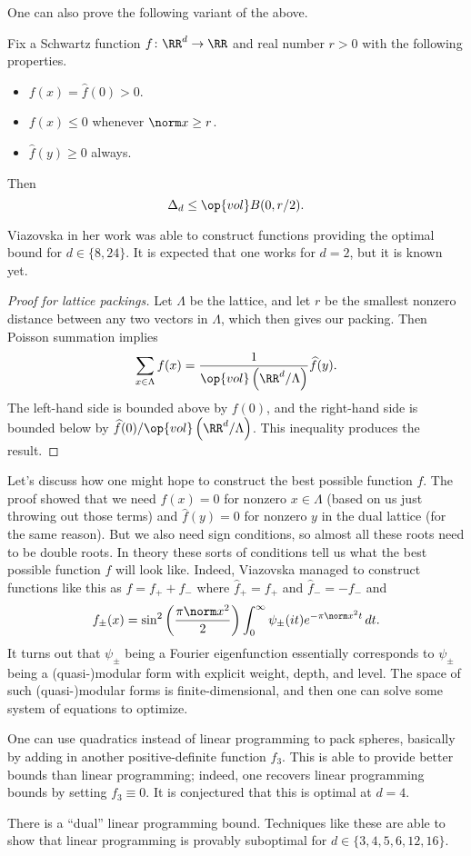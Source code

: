 \documentclass{article}
\begin{document}
One can also prove the following variant of the above.
\begin{theorem}
	Fix a Schwartz function $f\colon\RR^d\to\RR$ and real number $r>0$ with the following properties.
	\begin{itemize}
		\item $f(x)=\widehat f(0)>0$.
		\item $f(x)\le0$ whenever $\norm x\ge r$.
		\item $\widehat f(y)\ge0$ always.
	\end{itemize}
	Then
	\[\Delta_d\le\op{vol}B(0,r/2).\]
\end{theorem}
\begin{remark}
	Viazovska in her work was able to construct functions providing the optimal bound for $d\in\{8,24\}$. It is expected that one works for $d=2$, but it is known yet.
\end{remark}
\begin{proof}[Proof for lattice packings]
	Let $\Lambda$ be the lattice, and let $r$ be the smallest nonzero distance between any two vectors in $\Lambda$, which then gives our packing. Then Poisson summation implies
	\[\sum_{x\in\Lambda}f(x)=\frac1{\op{vol}\left(\RR^d/\Lambda\right)}\widehat f(y).\]
	The left-hand side is bounded above by $f(0)$, and the right-hand side is bounded below by $\widehat f(0)/\op{vol}\left(\RR^d/\Lambda\right)$. This inequality produces the result.
\end{proof}
Let's discuss how one might hope to construct the best possible function $f$. The proof showed that we need $f(x)=0$ for nonzero $x\in\Lambda$ (based on us just throwing out those terms) and $\widehat f(y)=0$ for nonzero $y$ in the dual lattice (for the same reason). But we also need sign conditions, so almost all these roots need to be double roots. In theory these sorts of conditions tell us what the best possible function $f$ will look like. Indeed, Viazovska managed to construct functions like this as $f=f_++f_-$ where $\widehat f_+=f_+$ and $\widehat f_-=-f_-$ and 
\[f_\pm(x)=\sin^2\left(\frac{\pi\norm x^2}2\right)\int_0^\infty\psi_\pm(it)e^{-\pi\norm x^2t}\,dt.\]
It turns out that $\psi_\pm$ being a Fourier eigenfunction essentially corresponds to $\psi_\pm$ being a (quasi-)modular form with explicit weight, depth, and level. The space of such (quasi-)modular forms is finite-dimensional, and then one can solve some system of equations to optimize.
\begin{remark}
	One can use quadratics instead of linear programming to pack spheres, basically by adding in another positive-definite function $f_3$. This is able to provide better bounds than linear programming; indeed, one recovers linear programming bounds by setting $f_3\equiv0$. It is conjectured that this is optimal at $d=4$.
\end{remark}
\begin{remark}
	There is a ``dual'' linear programming bound. Techniques like these are able to show that linear programming is provably suboptimal for $d\in\{3,4,5,6,12,16\}$.
\end{remark}
\end{document}

